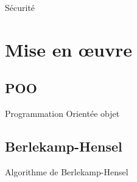 \documentclass{beamer}
\begin{document}
			\begin{frame}{Sécurité}
				
			\end{frame}

	\section{Mise en œuvre}

		\subsection{POO}

			\begin{frame}{Programmation Orientée objet}
				
			\end{frame}

		\subsection{Berlekamp-Hensel}

			\begin{frame}{Algorithme de Berlekamp-Hensel}
				
			\end{frame}
		
	    
\end{document}
